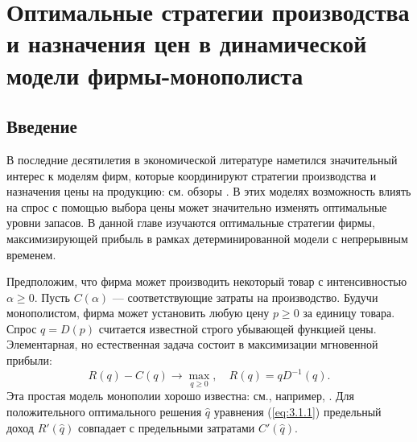 
\chapter{Оптимальные стратегии производства и назначения цен в динамической модели фирмы-монополиста} \label{chapt3}

\section{Введение} \label{sec:3.1}
\setcounter{equation}{0}
В последние десятилетия в экономической литературе наметился значительный интерес к моделям фирм, которые координируют стратегии производства и назначения цены на продукцию: см. обзоры \cite{EliSte93,YanGil04,CheLev12}. В этих моделях возможность влиять на спрос с помощью выбора цены может значительно изменять оптимальные уровни запасов. В данной главе изучаются оптимальные стратегии  фирмы, максимизирующей прибыль в рамках детерминированной модели с непрерывным временем.

Предположим, что фирма может производить некоторый товар с интенсивностью $\alpha\ge 0$. Пусть $C(\alpha)$ --- соответствующие затраты на производство. Будучи монополистом, фирма может установить любую цену $p\ge 0$ за единицу товара. Спрос $q=D(p)$ считается известной строго убывающей функцией цены. Элементарная, но естественная задача состоит в максимизации мгновенной прибыли:
\begin{equation} \label{eq:3.1.1}
 R(q)-C(q)\to\max_{q\ge 0},\quad R(q)=q D^{-1}(q).
\end{equation}
Эта простая модель монополии хорошо известна: см., например, \cite[Глава 14]{Var92}. Для положительного оптимального решения $\widehat q$ уравнения (\ref{eq:3.1.1}) предельный доход $R'(\widehat q)$ совпадает с предельными затратами $C'(\widehat q)$.

